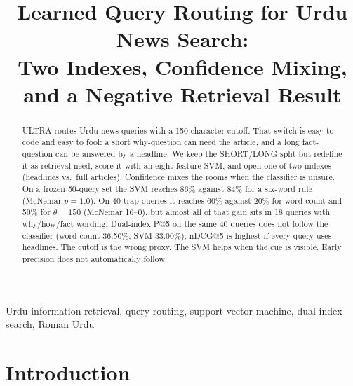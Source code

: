 \documentclass[conference]{IEEEtran}
\begin{document}
\title{Learned Query Routing for Urdu News Search:\\
Two Indexes, Confidence Mixing, and a Negative Retrieval Result}

\author{
\and
{}
}

\maketitle

\begin{abstract}
ULTRA routes Urdu news queries with a 150-character cutoff. That switch is easy to code and easy to fool: a short why-question can need the article, and a long fact-question can be answered by a headline. We keep the SHORT/LONG split but redefine it as retrieval need, score it with an eight-feature SVM, and open one of two indexes (headlines vs.\ full articles). Confidence mixes the rooms when the classifier is unsure. On a frozen 50-query set the SVM reaches 86\% against 84\% for a six-word rule (McNemar $p=1.0$). On 40 trap queries it reaches 60\% against 20\% for word count and 50\% for $\theta=150$ (McNemar 16--0), but almost all of that gain sits in 18 queries with why/how/fact wording. Dual-index P@5 on the same 40 queries does not follow the classifier (word count 36.50\%, SVM 33.00\%); nDCG@5 is highest if every query uses headlines. The cutoff is the wrong proxy. The SVM helps when the cue is visible. Early precision does not automatically follow.
\end{abstract}

\begin{IEEEkeywords}
Urdu information retrieval, query routing, support vector machine, dual-index search, Roman Urdu
\end{IEEEkeywords}

\section{Introduction}
\end{document}

